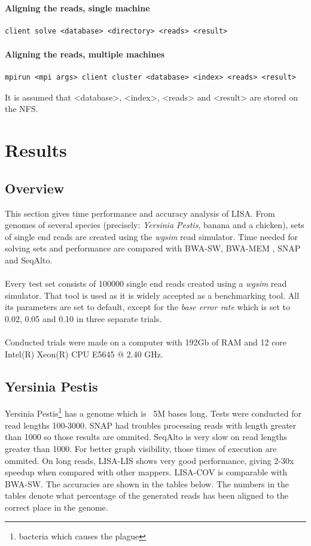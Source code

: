 \documentclass[times, utf8, diplomski]{fer}
\begin{document}
\subsubsection{Aligning the reads, single machine}
\begin{lstlisting}
client solve <database> <directory> <reads> <result>
\end{lstlisting}

\subsubsection{Aligning the reads, multiple machines}
\begin{lstlisting}
mpirun <mpi args> client cluster <database> <index> <reads> <result>
\end{lstlisting}
It is assumed that <database>, <index>, <reads> and <result> are stored on the NFS.

\chapter{Results}
\section{Overview}
This section gives time performance and accuracy analysis of LISA. From genomes of several species (precisely: \emph{Yersinia Pestis}, banana and a chicken), sets of single end reads are created using the \emph{wgsim}\cite{wgsim} read simulator. Time needed for solving sets and performance are compared with BWA-SW, BWA-MEM \cite{Li:2010:FAL:1741823.1741825}, SNAP and SeqAlto.\\
\\
Every test set consists of 100000 single end reads created using a \emph{wgsim} read simulator. That tool is used as it is widely accepted as a benchmarking tool. All its parameters are set to default, except for the \emph{base error rate} which is set to 0.02, 0.05 and 0.10 in three separate trials.\\
\\
Conducted trials were made on a computer with 192Gb of RAM and 12 core Intel(R) Xeon(R) CPU E5645 @ 2.40 GHz.


\section{Yersinia Pestis}

Yersinia Pestis\footnote{bacteria which causes the plague} has a genome which is ~5M bases long. Tests were conducted for read lengths 100-3000. SNAP had troubles processing reads with length greater than 1000 so those results are ommited. SeqAlto is very slow on read lengths greater than 1000. For better graph visibility, those times of execution are ommited. On long reads, LISA-LIS shows very good performance, giving 2-30x speedup when compared with other mappers. LISA-COV is comparable with BWA-SW. The accuracies are shown in the tables below. The numbers in the tables denote what percentage of the generated reads has been aligned to the correct place in the genome. 
\end{document}
